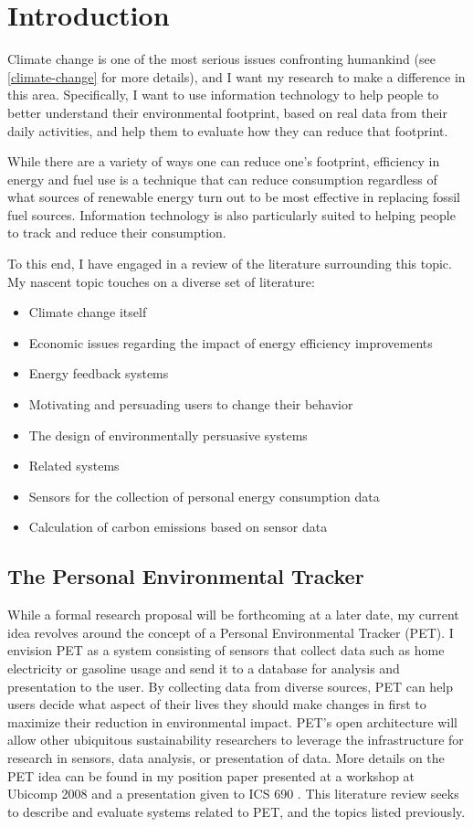 \chapter{Introduction}
Climate change is one of the most serious issues confronting humankind (see \autoref{climate-change} for more details), and I want my research to make a difference in this area. Specifically, I want to use information technology to help people to better understand their environmental footprint, based on real data from their daily activities, and help them to evaluate how they can reduce that footprint.

While there are a variety of ways one can reduce one's footprint, efficiency in energy and fuel use is a technique that can reduce consumption regardless of what sources of renewable energy turn out to be most effective in replacing fossil fuel sources. Information technology is also particularly suited to helping people to track and reduce their consumption.

To this end, I have engaged in a review of the literature surrounding this topic. My nascent topic touches on a diverse set of literature:
\begin{itemize}
	\item Climate change itself
	\item Economic issues regarding the impact of energy efficiency improvements
	\item Energy feedback systems
	\item Motivating and persuading users to change their behavior
	\item The design of environmentally persuasive systems
	\item Related systems
	\item Sensors for the collection of personal energy consumption data
	\item Calculation of carbon emissions based on sensor data
\end{itemize}

\section{The Personal Environmental Tracker}
\label{PET-description}
While a formal research proposal will be forthcoming at a later date, my current idea revolves around the concept of a Personal Environmental Tracker (PET). I envision PET as a system consisting of sensors that collect data such as home electricity or gasoline usage and send it to a database for analysis and presentation to the user. By collecting data from diverse sources, PET can help users decide what aspect of their lives they should make changes in first to maximize their reduction in environmental impact. PET's open architecture will allow other ubiquitous sustainability researchers to leverage the infrastructure for research in sensors, data analysis, or presentation of data. More details on the PET idea can be found in my position paper presented at a workshop at Ubicomp 2008 \cite{csdl2-08-01} and a presentation given to ICS 690 \cite{Brewer2008-PET-presentation}. This literature review seeks to describe and evaluate systems related to PET, and the topics listed previously.